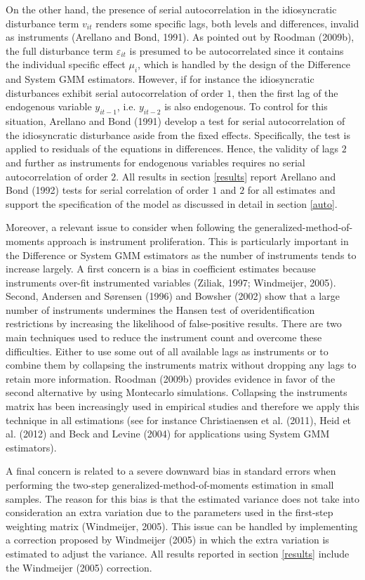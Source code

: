 On the other hand, the presence of serial autocorrelation in the idiosyncratic disturbance term $v_{it}$ renders some specific lags, both levels and differences, invalid as instruments (Arellano and Bond, 1991). As pointed out by Roodman (2009b), the full disturbance term $\varepsilon_{it}$ is presumed to be autocorrelated since it contains the individual specific effect $\mu_i$, which is handled by the design of the Difference and System GMM estimators. However, if for instance the idiosyncratic disturbances exhibit serial autocorrelation of order $1$, then the first lag of the endogenous variable $y_{it-1}$, i.e. $y_{it-2}$ is also endogenous. To control for this situation, Arellano and Bond (1991) develop a test for serial autocorrelation of the idiosyncratic disturbance aside from the fixed effects. Specifically, the test is applied to residuals of the equations in differences. Hence, the validity of lags $2$ and further as instruments for endogenous variables requires no serial autocorrelation of order $2$. All results in section \ref{results} report Arellano and Bond (1992) tests for serial correlation of order $1$ and $2$ for all estimates and support the specification of the model as discussed in detail in section \ref{auto}.

Moreover, a relevant issue to consider when following the generalized-method-of-moments approach is instrument proliferation. This is particularly important in the Difference or System GMM estimators as the number of instruments tends to increase largely. A first concern is a bias in coefficient estimates because instruments over-fit instrumented variables (Ziliak, 1997; Windmeijer, 2005). Second, Andersen and S\o rensen (1996) and Bowsher (2002) show that a large number of instruments undermines the Hansen test of overidentification restrictions by increasing the likelihood of false-positive results. There are two main techniques used to reduce the instrument count and overcome these difficulties. Either to use some out of all available lags as instruments or to combine them by collapsing the instruments matrix without dropping any lags to retain more information. Roodman (2009b) provides evidence in favor of the second alternative by using Montecarlo simulations. Collapsing the instruments matrix has been increasingly used in empirical studies and therefore we apply this technique in all estimations (see for instance Christiaensen et al. (2011), Heid et al. (2012) and Beck and Levine (2004) for applications using System GMM estimators).

A final concern is related to a severe downward bias in standard errors when performing the two-step generalized-method-of-moments estimation in small samples. The reason for this bias is that the estimated variance does not take into consideration an extra variation due to the parameters used in the first-step weighting matrix (Windmeijer, 2005). This issue can be handled by implementing a correction proposed by Windmeijer (2005) in which the extra variation is estimated to adjust the variance. All results reported in section \ref{results} include the Windmeijer (2005) correction.


